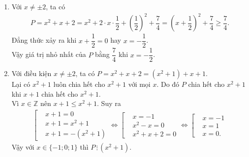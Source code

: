 \begin{bt}
{\begin{enumerate}
\begin{eqnarray*}
    &=& \left[\dfrac{1}{x-2} + \dfrac{x^2}{(x-2)(x^2+2x+4)} \cdot \dfrac{x^2+2x+4}{x+2}\right] : \dfrac{1}{x^2-4}\\
    &=& \dfrac{x+2 + x^2}{(x-2)(x+2)} : \dfrac{1}{(x-2)(x+2)} = \dfrac{(x^2+x+2)(x-2)(x+2)}{(x-2)(x+2)}\\
    &=& x^2+x+2.
   \end{eqnarray*}
   \item Với $x\neq \pm 2$, ta có
   \begin{eqnarray*}
    P = x^2+x+2 = x^2 + 2 \cdot x \cdot \dfrac{1}{2} + \left(\dfrac{1}{2}\right)^2 + \dfrac{7}{4} = \left(x+\dfrac{1}{2}\right)^2 + \dfrac{7}{4} \geq \dfrac{7}{4}.
   \end{eqnarray*}
   Đẳng thức xảy ra khi $x+\dfrac{1}{2}=0$ hay $x=-\dfrac{1}{2}$.\\
   Vậy giá trị nhỏ nhất của $P$ bằng $\dfrac{7}{4}$ khi $x=-\dfrac{1}{2}$.
   \item Với điều kiện $x \neq \pm 2$, ta có $P = x^2+x+2 = (x^2+1)+x+1$.\\
   Lại có $x^2+1$ luôn chia hết cho $x^2+1$ với mọi $x$. Do đó $P$ chia hết cho $x^2+1$ khi $x+1$ chia hết cho $x^2+1$.\\
   Vì $x\in\mathbb{Z}$ nên $x+1 \leq x^2+1$. Suy ra
   \allowdisplaybreaks
   \begin{eqnarray*}
    \left[\begin{aligned}&x+1=0 \\&x+1=x^2+1 \\&x+1=-(x^2+1)\end{aligned}\right. \Leftrightarrow \left[\begin{aligned}&x=-1 \\&x^2-x=0 \\&x^2+x+2=0\end{aligned}\right. \Leftrightarrow \left[\begin{aligned}&x=-1 \\&x= 1 \\&x=0.\end{aligned}\right.
   \end{eqnarray*}
   Vậy với $x \in \{-1;0;1\}$ thì $P \,\vdots\,(x^2+1)$.
  \end{enumerate}
  }
\end{bt}

